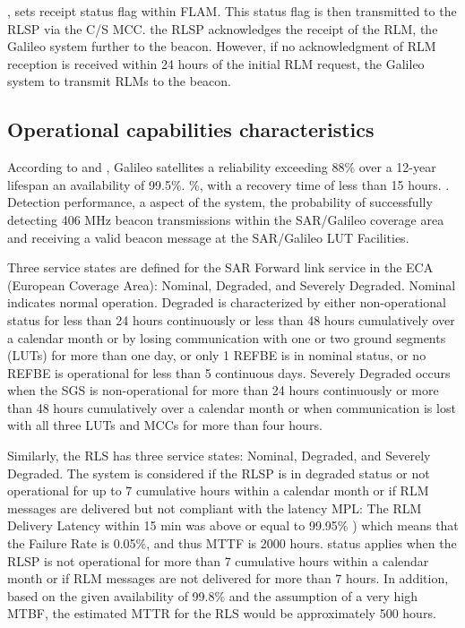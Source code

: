 , sets  receipt status flag within FLAM. This status flag is then transmitted to the RLSP via the C/S MCC.  the RLSP acknowledges the receipt of the RLM, the Galileo system  further  to the beacon. However, if no acknowledgment of RLM reception is received within 24 hours of the initial RLM request, the Galileo system  to transmit RLMs to the beacon.

\subsection{Operational capabilities characteristics}



According to \cite{galileoperformances} and \cite{galileoossdd}, Galileo satellites  a reliability exceeding 88\% over a 12-year lifespan  an availability of 99.5\%.  \cite{galileoosperformancereport} \%, with a recovery time of less than 15 hours. . Detection performance, a  aspect of the system,  the probability of successfully detecting 406 MHz beacon transmissions within the SAR/Galileo coverage area and receiving a valid beacon message at the SAR/Galileo LUT Facilities.

Three service states are defined for the SAR Forward link service in the ECA (European Coverage Area): Nominal, Degraded, and Severely Degraded. Nominal indicates normal operation. Degraded is characterized by either non-operational status for less than 24 hours continuously or less than 48 hours cumulatively over a calendar month or by losing communication with one or two ground segments (LUTs) for more than one day, or only 1 REFBE is in nominal status, or no REFBE is operational for less than 5 continuous days. Severely Degraded occurs when the SGS is non-operational for more than 24 hours continuously or more than 48 hours cumulatively over a calendar month or when communication is lost with all three LUTs and MCCs for more than four hours.

Similarly, the RLS has three service states: Nominal, Degraded, and Severely Degraded. The system is considered  if the RLSP is in degraded status or not operational for up to 7 cumulative hours within a calendar month or if RLM messages are delivered but not compliant with the latency MPL: The RLM Delivery Latency within 15 min was above or equal to 99.95\% \cite{galileoperformances}) which means that the Failure Rate is 0.05\%, and thus MTTF  is 2000 hours.  status applies when the RLSP is not operational for more than 7 cumulative hours within a calendar month or if RLM messages are not delivered for more than 7 hours. In addition, based on the given availability of 99.8\% and the assumption of a very high MTBF, the estimated MTTR for the RLS would be approximately 500 hours.

